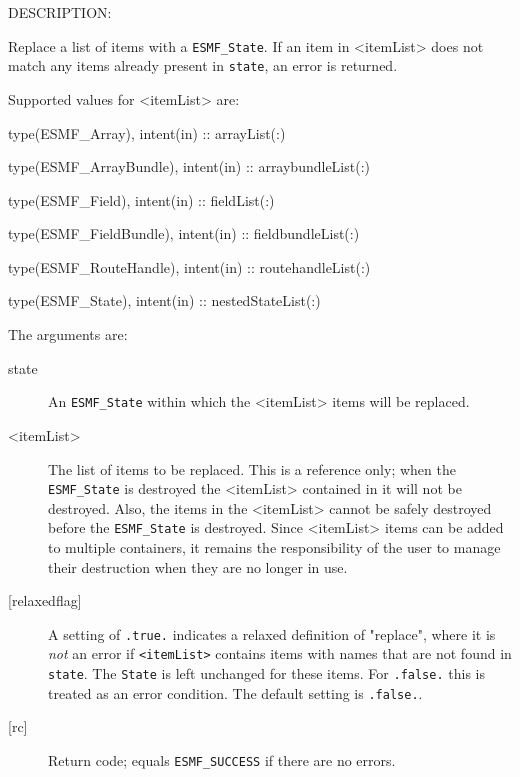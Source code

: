 {\sf DESCRIPTION:\\ }


   Replace a list of items with a {\tt ESMF\_State}. If an item in
   <itemList> does not match any items already present in {\tt state}, an
   error is returned.
  
   Supported values for <itemList> are:
   \begin{description}
   \item type(ESMF\_Array), intent(in) :: arrayList(:)
   \item type(ESMF\_ArrayBundle), intent(in) :: arraybundleList(:)
   \item type(ESMF\_Field), intent(in) :: fieldList(:)
   \item type(ESMF\_FieldBundle), intent(in) :: fieldbundleList(:)
   \item type(ESMF\_RouteHandle), intent(in) :: routehandleList(:)
   \item type(ESMF\_State), intent(in) :: nestedStateList(:)
   \end{description}
  
   The arguments are:
   \begin{description}
   \item[state]
   An {\tt ESMF\_State} within which the <itemList> items will be replaced.
   \item[<itemList>]
   The list of items to be replaced.
   This is a reference only; when
   the {\tt ESMF\_State} is destroyed the <itemList> contained in it will
   not be destroyed. Also, the items in the <itemList> cannot be safely
   destroyed before the {\tt ESMF\_State} is destroyed.
   Since <itemList> items can be added to multiple containers, it remains
   the responsibility of the user to manage their
   destruction when they are no longer in use.
   \item[{[relaxedflag]}]
   A setting of {\tt .true.} indicates a relaxed definition of "replace",
   where it is {\em not} an error if {\tt <itemList>} contains items
   with names that are not found in {\tt state}. The {\tt State}
   is left unchanged for these items. For {\tt .false.} this is treated
   as an error condition. The default setting is {\tt .false.}.
   \item[{[rc]}]
   Return code; equals {\tt ESMF\_SUCCESS} if there are no errors.
   \end{description}
\setlength{\parskip}{\oldparskip}
\setlength{\parindent}{\oldparindent}
\setlength{\baselineskip}{\oldbaselineskip}
